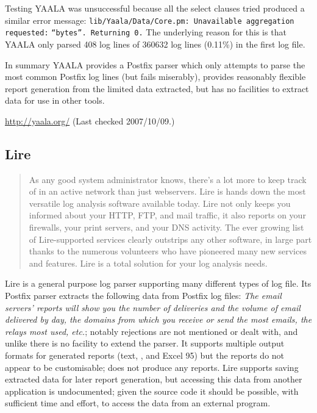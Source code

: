 Testing YAALA was unsuccessful because all the select clauses tried
produced a similar error message:
\newline\tab{}\texttt{lib/Yaala/Data/Core.pm: Unavailable aggregation
requested:} \newline\tab{}\texttt{``bytes''. Returning 0.} \newline  The
underlying reason for this is that YAALA only parsed 408 log lines of
360632 log lines (0.11\%) in the first log file.

In summary YAALA provides a Postfix parser which only attempts to parse the
most common Postfix log lines (but fails miserably), provides reasonably
flexible report generation from the limited data extracted, but has no
facilities to extract data for use in other tools.

\url{http://yaala.org/} \newline (Last checked 2007/10/09.)

\subsection{Lire}

\begin{quotation}

    As any good system administrator knows, there's a lot more to keep
    track of in an active network than just webservers. Lire is hands down
    the most versatile log analysis software available today. Lire not only
    keeps you informed about your HTTP, FTP, and mail traffic, it also
    reports on your firewalls, your print servers, and your DNS activity.
    The ever growing list of Lire-supported services clearly outstrips any
    other software, in large part thanks to the numerous volunteers who
    have pioneered many new services and features. Lire is a total solution
    for your log analysis needs.

\end{quotation}

Lire is a general purpose log parser supporting many different types of log
file.  Its Postfix parser extracts the following data from Postfix log
files: \textit{The email servers' reports will show you the number of
deliveries and the volume of email delivered by day, the domains from which
you receive or send the most emails, the relays most used, etc.\/}; notably
rejections are not mentioned or dealt with, and unlike \parsername{} there
is no facility to extend the parser.  It supports multiple output formats
for generated reports (text, \HTML{}, \PDF{} and Excel 95) but the reports
do not appear to be customisable; \parsername{} does not produce any
reports.  Lire supports saving extracted data for later report generation,
but accessing this data from another application is undocumented; given the
source code it should be possible, with sufficient time and effort, to
access the data from an external program.

